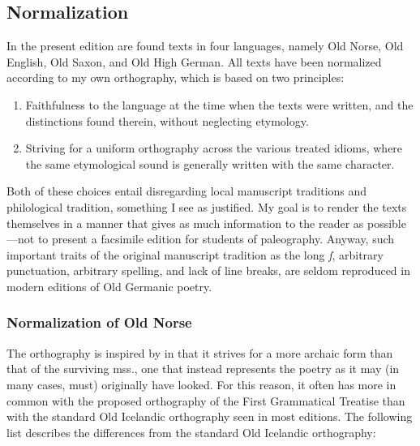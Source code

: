   \subsection{Normalization}
    In the present edition are found texts in four languages, namely Old Norse, Old English, Old Saxon, and Old High German.  All texts have been normalized according to my own orthography, which is based on two principles:
    \begin{enumerate}
      \item Faithfulness to the language at the time when the texts were written, and the distinctions found therein, without neglecting etymology.
      \item Striving for a uniform orthography across the various treated idioms, where the same etymological sound is generally written with the same character.
    \end{enumerate}
    Both of these choices entail disregarding local manuscript traditions and philological tradition, something I see as justified.  My goal is to render the texts themselves in a manner that gives as much information to the reader as possible—not to present a facsimile edition for students of paleography.  Anyway, such important traits of the original manuscript tradition as the long \emph{ſ}, arbitrary punctuation, arbitrary spelling, and lack of line breaks, are seldom reproduced in modern editions of Old Germanic poetry.

    \subsubsection{Normalization of Old Norse}
    The orthography is inspired by \textcite{FinnurEdda} in that it strives for a more archaic form than that of the surviving mss., one that instead represents the poetry as it may (in many cases, must) originally have looked. For this reason, it often has more in common with the proposed orthography of the First Grammatical Treatise than with the standard Old Icelandic orthography seen in most editions. The following list describes the differences from the standard Old Icelandic orthography:

